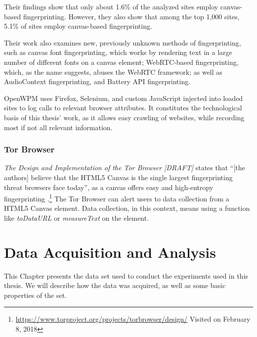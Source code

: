 \documentclass[
    fontsize=12pt,
    headings=small,
    parskip=half,
    bibliography=totoc,
    numbers=noenddot,
    open=any
    ]{scrreprt}
\begin{document}
Their findings show that only about 1.6\% of the analyzed sites
employ canvas-based fingerprinting. However, they also show that among the top 1,000 sites,
5.1\% of sites employ canvas-based fingerprinting.

Their work also examines new, previously unknown methods of fingerprinting, such as canvas font fingerprinting, which
works by rendering text in a large number of different fonts on a canvas element; WebRTC-based fingerprinting, which,
as the name suggests, abuses the WebRTC framework; as well as AudioContext fingerprinting, and Battery API fingerprinting.

OpenWPM uses Firefox, Selenium, and custom JavaScript injected into loaded sites to log calls to relevant browser attributes.
It constitutes the technological basis of this thesis' work, as it allows easy crawling of websites, while recording
most if not all relevant information.


\subsection{Tor Browser}
\label{related_work:tor_browser}
\textit{The Design and Implementation of the Tor Browser [DRAFT]}
states that ``[the authors] believe that the HTML5 Canvas is the single largest fingerprinting threat browsers face today'',
as a canvas offers easy and high-entropy fingerprinting
\cite{acar2014web,mowery2012pixel}.\footnote{\url{https://www.torproject.org/projects/torbrowser/design/} Visited on February 8, 2018}
The Tor Browser can alert users to data collection from a HTML5 Canvas element.
Data collection, in this context, means using a function like \textit{toDataURL} or \textit{measureText} on the element.



\chapter{Data Acquisition and Analysis}
\label{chap:data_acquisition}
This Chapter presents the data set used to conduct the experiments used in this thesis.
We will describe how the data was acquired, as well as some basic properties of the set.
\end{document}
